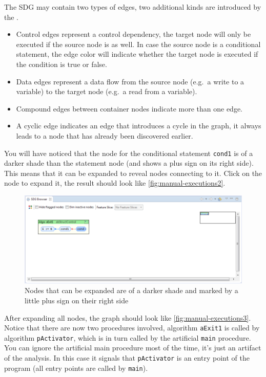 The SDG may contain two types of edges, two additional kinds are introduced by the \SB.

\begin{itemize}
  \item Control edges represent a control dependency, the target node will only be executed if the source node is as 
  well. In case the source node is a conditional statement, the edge color will indicate whether the target node is 
  executed if the condition is true or false.
  
  \item Data edges represent a data flow from the source node (e.g.\ a write to a variable) to the target node (e.g.\ a 
  read from a variable).
  
  \item Compound edges between container nodes indicate more than one edge.
  
  \item A cyclic edge indicates an edge that introduces a cycle in the graph, it always leads to a node that has 
  already been discovered earlier.
\end{itemize}

You will have noticed that the node for the conditional statement \lstinline|cond1| is of a darker shade than the 
statement node (and shows a plus sign on its right side). This means that it can be expanded to reveal nodes connecting 
to it. Click on the node to expand it, the result should look like \autoref{fig:manual-executions2}.

\begin{figure}[hp]
  \centering
    \includegraphics[width=\textwidth]{bilder/manual-executions2}
  \caption{Nodes that can be expanded are of a darker shade and marked by a little plus sign on their right side}
  \label{fig:manual-executions2}
\end{figure}

After expanding all nodes, the graph should look like \autoref{fig:manual-executions3}. Notice that there are now two 
procedures involved, algorithm \lstinline|aExit1| is called by algorithm \lstinline|pActivator|, which is in turn 
called by the artificial \lstinline|main| procedure. You can ignore the artificial main procedure most of the time, 
it's just an artifact of the analysis. In this case it signals that \lstinline|pActivator| is an entry point of the 
program (all entry points are called by \lstinline|main|).

